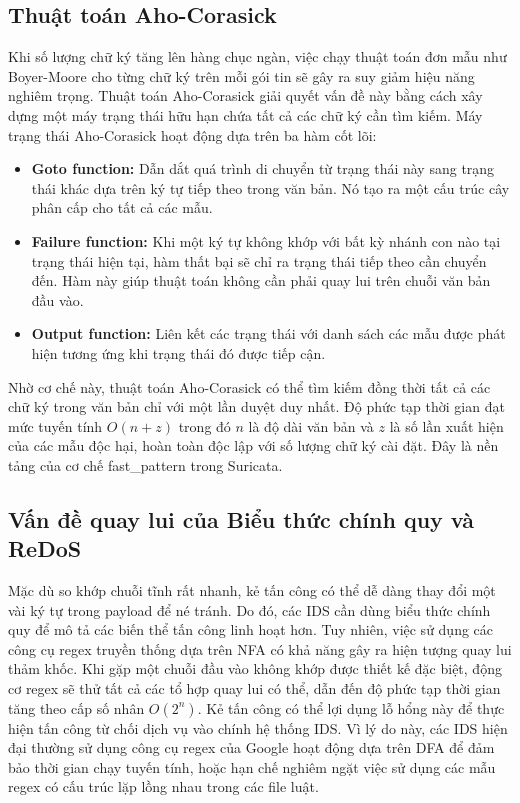 \subsection{Thuật toán Aho-Corasick}
Khi số lượng chữ ký tăng lên hàng chục ngàn, việc chạy thuật toán đơn mẫu như Boyer-Moore cho từng chữ ký trên mỗi gói tin sẽ gây ra suy giảm hiệu năng nghiêm trọng. Thuật toán Aho-Corasick giải quyết vấn đề này bằng cách xây dựng một máy trạng thái hữu hạn chứa tất cả các chữ ký cần tìm kiếm.
Máy trạng thái Aho-Corasick hoạt động dựa trên ba hàm cốt lõi:
\begin{itemize}
    \item \textbf{Goto function:} Dẫn dắt quá trình di chuyển từ trạng thái này sang trạng thái khác dựa trên ký tự tiếp theo trong văn bản. Nó tạo ra một cấu trúc cây phân cấp cho tất cả các mẫu.
    \item \textbf{Failure function:} Khi một ký tự không khớp với bất kỳ nhánh con nào tại trạng thái hiện tại, hàm thất bại sẽ chỉ ra trạng thái tiếp theo cần chuyển đến. Hàm này giúp thuật toán không cần phải quay lui trên chuỗi văn bản đầu vào.
    \item \textbf{Output function:} Liên kết các trạng thái với danh sách các mẫu được phát hiện tương ứng khi trạng thái đó được tiếp cận.
\end{itemize}
Nhờ cơ chế này, thuật toán Aho-Corasick có thể tìm kiếm đồng thời tất cả các chữ ký trong văn bản chỉ với một lần duyệt duy nhất. Độ phức tạp thời gian đạt mức tuyến tính $O(n + z)$ trong đó $n$ là độ dài văn bản và $z$ là số lần xuất hiện của các mẫu độc hại, hoàn toàn độc lập với số lượng chữ ký cài đặt. Đây là nền tảng của cơ chế fast\_pattern trong Suricata.

\subsection{Vấn đề quay lui của Biểu thức chính quy và ReDoS}
Mặc dù so khớp chuỗi tĩnh rất nhanh, kẻ tấn công có thể dễ dàng thay đổi một vài ký tự trong payload để né tránh. Do đó, các IDS cần dùng biểu thức chính quy để mô tả các biến thể tấn công linh hoạt hơn. Tuy nhiên, việc sử dụng các công cụ regex truyền thống dựa trên NFA có khả năng gây ra hiện tượng quay lui thảm khốc.
Khi gặp một chuỗi đầu vào không khớp được thiết kế đặc biệt, động cơ regex sẽ thử tất cả các tổ hợp quay lui có thể, dẫn đến độ phức tạp thời gian tăng theo cấp số nhân $O(2^n)$. Kẻ tấn công có thể lợi dụng lỗ hổng này để thực hiện tấn công từ chối dịch vụ vào chính hệ thống IDS. Vì lý do này, các IDS hiện đại thường sử dụng công cụ regex của Google hoạt động dựa trên DFA để đảm bảo thời gian chạy tuyến tính, hoặc hạn chế nghiêm ngặt việc sử dụng các mẫu regex có cấu trúc lặp lồng nhau trong các file luật.

